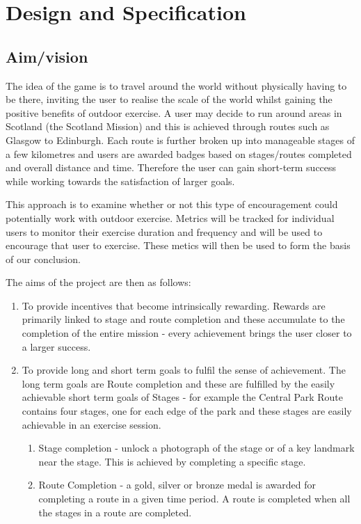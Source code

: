 \chapter{Design and Specification}\label{ch_method}

\section{Aim/vision}

The idea of the game is to travel around the world without physically
having to be there, inviting the user to realise the scale of the
world whilst gaining the positive benefits of outdoor exercise. A user
may decide to run around areas in Scotland (the Scotland Mission) and
this is achieved through routes such as Glasgow to Edinburgh. Each
route is further broken up into manageable stages of a few kilometres
and users are awarded badges based on stages/routes completed and
overall distance and time. Therefore the user can gain short-term
success while working towards the satisfaction of larger goals. 

This approach is to examine whether or not this type of encouragement
could potentially work with outdoor exercise. Metrics will be tracked
for individual users to monitor their exercise duration and frequency
and will be used to encourage that user to exercise. These metics will
then be used to form the basis of our conclusion.

The aims of the project are then as follows:

\begin{enumerate}
  \item To provide incentives that become intrinsically
    rewarding. Rewards are primarily linked to stage and route 
    completion and these accumulate to the completion of the entire
    mission - every achievement brings the user closer to a larger
    success. 
  \item To provide long and short term goals to fulfil the sense of
    achievement. The long term goals are Route completion and these are
    fulfilled by the easily achievable short term goals of Stages -
    for example the Central Park Route contains four stages, one for
    each edge of the park and these stages are easily achievable in an
    exercise session.
    \begin{enumerate}
      \item Stage completion - unlock a photograph of the stage or of
        a key landmark near the stage. This is achieved by completing
        a specific stage.
      \item Route Completion - a gold, silver or bronze medal is
        awarded for completing a route in a given time period. A route
        is completed when all the stages in a route are completed.
    \end{enumerate}
\end{enumerate}


